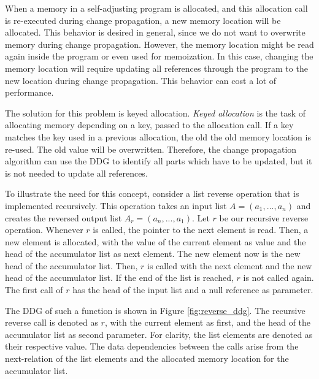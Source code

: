 When a memory in a self-adjusting program is allocated, and this allocation call is re-executed during change propagation, a new memory location will be allocated. This behavior is desired in general, since we do not want to overwrite memory during change propagation. However, the memory location might be read again inside the program or even used for memoization. In this case, changing the memory location will require updating all references through the program to the new location during change propagation. This behavior can cost a lot of performance. 

The solution for this problem is keyed allocation. \textit{Keyed allocation} is the task of allocating memory depending on a key, passed to the allocation call. If a key matches the key used in a previous allocation, the old the old memory location is re-used. The old value will be overwritten. Therefore, the change propagation algorithm can use the DDG to identify all parts which have to be updated, but it is not needed to update all references. 

To illustrate the need for this concept, consider a list reverse operation that is implemented recursively. This operation takes an input list $A = (a_1, ..., a_n)$ and creates the reversed output list $A_r = (a_n, ..., a_1)$. Let $r$ be our recursive reverse operation. Whenever $r$ is called, the pointer to the next element is read. Then, a new element is allocated, with the value of the current element as value and the head of the accumulator list as next element. The new element now is the new head of the accumulator list. Then, $r$ is called with the next element and the new head of the accumulator list. If the end of the list is reached, $r$ is not called again. The first call of $r$ has the head of the input list and a null reference as parameter. 

The DDG of such a function is shown in Figure \ref{fig:reverse_ddg}. The recursive reverse call is denoted as $r$, with the current element as first, and the head of the accumulator list as second parameter. For clarity, the list elements are denoted as their respective value. The data dependencies between the calls arise from the next-relation of the list elements and the allocated memory location for the accumulator list. 


